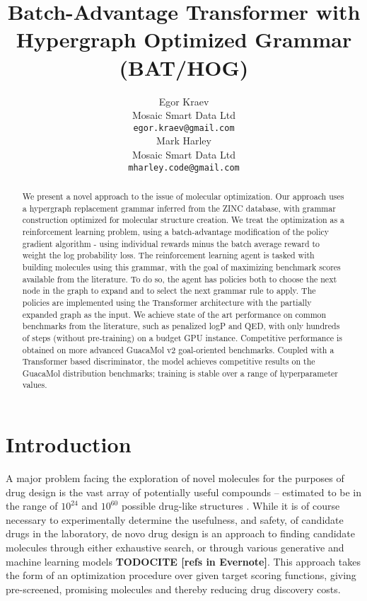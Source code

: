 \documentclass{article}
\title{Batch-Advantage Transformer with Hypergraph Optimized Grammar (BAT/HOG)}
\author{%
  Egor Kraev \\
  Mosaic Smart Data Ltd \\
  \texttt{egor.kraev@gmail.com} \\
  \And
  Mark Harley \\
  Mosaic Smart Data Ltd \\
  \texttt{mharley.code@gmail.com}
}
\newcommand{\CITE}[1]{{\bf TODOCITE [#1]}}
\begin{document}
\maketitle

\begin{abstract}
We present a novel approach to the issue of molecular optimization. Our approach uses a hypergraph replacement grammar inferred from the ZINC database, with grammar construction optimized for molecular structure creation. We treat the optimization as a reinforcement learning problem, using a batch-advantage modification of the policy gradient algorithm - using individual rewards minus the batch average reward to weight the log probability loss. The reinforcement learning agent is tasked with building molecules using this grammar, with the goal of maximizing benchmark scores available from the literature. To do so, the agent has policies both to choose the next node in the graph to expand and to select the next grammar rule to apply. The policies are implemented using the Transformer architecture with the partially expanded graph as the input. We achieve state of the art performance on common benchmarks from the literature, such as penalized logP and QED, with only hundreds of steps (without pre-training) on a budget GPU instance. Competitive performance is obtained on more advanced GuacaMol v2 goal-oriented benchmarks. Coupled with a Transformer based discriminator, the model achieves competitive results on the GuacaMol distribution benchmarks; training is stable over a range of hyperparameter values.
\end{abstract}

\section{Introduction}\label{sec:intro}
A major problem facing the exploration of novel molecules for the purposes of drug design is the vast array of potentially useful compounds -- estimated to be in the range of $10^{24}$ and $10^{60}$ possible drug-like structures \cite{walters2019, ruddigkeit2012}. While it is of course necessary to experimentally determine the usefulness, and safety, of candidate drugs in the laboratory, de novo drug design is an approach to finding candidate molecules through either exhaustive search, or through various generative and machine learning models \CITE{refs in Evernote}. This approach takes the form of an optimization procedure over given target scoring functions, giving pre-screened, promising molecules and thereby reducing drug discovery costs.
\end{document}
